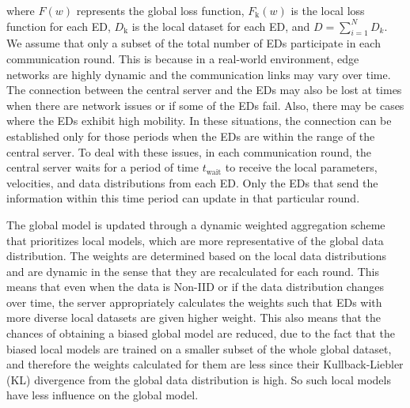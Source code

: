 \documentclass[journal]{IEEEtran}
\begin{document}
where $F(w)$ represents the global loss function, ${F}_{\text{k}}(w)$ is the local loss function for each ED, ${D}_{\text{k}}$ is the local dataset for each ED, and $D = \sum_{i=1}^N D_k$. We assume that only a subset of the total number of EDs participate in each communication round. This is because in a real-world environment, edge networks are highly dynamic and the communication links may vary over time. The connection between the central server and the EDs may also be lost at times when there are network issues or if some of the EDs fail. Also, there may be cases where the EDs exhibit high mobility. In these situations, the connection can be established only for those periods when the EDs are within the range of the central server. To deal with these issues, in each communication round, the central server waits for a period of time $t_{\text{wait}}$ to receive the local parameters, velocities, and data distributions from each ED. Only the EDs that send the information within this time period can update in that particular round.

The global model is updated through a dynamic weighted aggregation scheme that prioritizes local models, which are more representative of the global data distribution. The weights are determined based on the local data distributions and are dynamic in the sense that they are recalculated for each round. This means that even when the data is Non-IID or if the data distribution changes over time, the server appropriately calculates the weights such that EDs with more diverse local datasets are given higher weight. This also means that the chances of obtaining a biased global model are reduced, due to the fact that the biased local models are trained on a smaller subset of the whole global dataset, and therefore the weights calculated for them are less since their Kullback-Liebler (KL) divergence from the global data distribution is high. So such local models have less influence on the global model.
\end{document}

